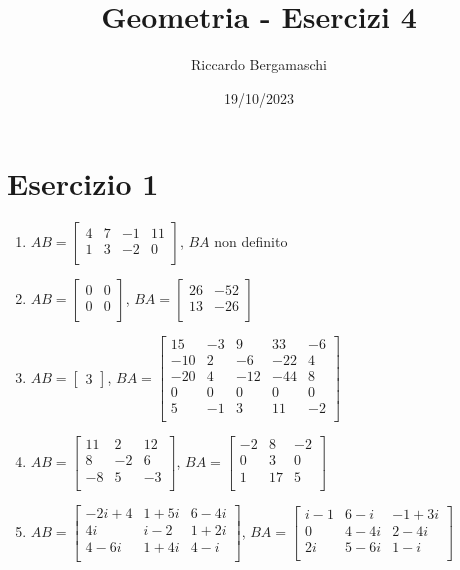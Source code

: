 \documentclass{article}
\title{Geometria - Esercizi 4}
\author{Riccardo Bergamaschi}
\date{19/10/2023}
\newcommand*{\m}[1]{\begin{bmatrix}#1\end{bmatrix}}
\begin{document}
\maketitle
\section*{Esercizio 1}
\begin{enumerate}
    \item $AB=\m{
        4 & 7 & -1 & 11 \\
        1 & 3 & -2 & 0 \\
    }$, $BA$ non definito
    \item $AB=\m{
        0 & 0 \\
        0 & 0 \\
    }$, $BA=\m{
        26 & -52 \\
        13 & -26 \\
    }$
    \item $AB=\m{3}$, $BA=\m{
        15 & -3 & 9 & 33 & -6 \\
        -10 & 2 & -6 & -22 & 4 \\
        -20 & 4 & -12 & -44 & 8 \\
        0 & 0 & 0 & 0 & 0 \\
        5 & -1 & 3 & 11 & -2 \\
    }$
    \item $AB=\m{
        11 & 2 & 12 \\
        8 & -2 & 6 \\
        -8 & 5 & -3 \\
    }$, $BA=\m{
        -2 & 8 & -2 \\
        0 & 3 & 0 \\
        1 & 17 & 5 \\
    }$
    \item $AB=\m{
        -2i+4 & 1+5i & 6-4i \\
        4i & i-2 & 1+2i \\
        4-6i & 1+4i & 4-i \\
    }$, $BA=\m{
        i-1 & 6-i & -1+3i \\
        0 & 4-4i & 2-4i \\
        2i & 5-6i & 1-i \\
    }$
\end{enumerate}
\end{document}
